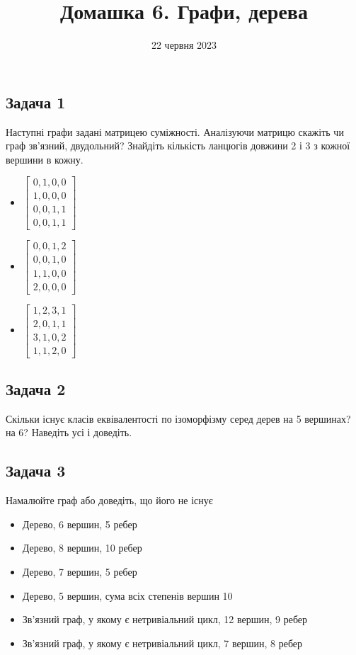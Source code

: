 \documentclass{article}
\begin{document}
\title{Домашка 6. Графи, дерева}
\date{22 червня 2023}

\maketitle

\subsection*{Задача 1}
Наступні графи задані матрицею суміжності. Аналізуючи матрицю скажіть чи граф зв'язний, двудольний? Знайдіть кількість
ланцюгів довжини 2 і 3 з кожної вершини в кожну.
\begin{itemize}
    \item
        $\begin{bmatrix}
            0,1,0,0 \\
            1,0,0,0 \\
            0,0,1,1 \\
            0,0,1,1
        \end{bmatrix}$
    \item
        $\begin{bmatrix}
            0,0,1,2 \\
            0,0,1,0 \\
            1,1,0,0 \\
            2,0,0,0
        \end{bmatrix}$
    \item
        $\begin{bmatrix}
            1,2,3,1 \\
            2,0,1,1 \\
            3,1,0,2 \\
            1,1,2,0
        \end{bmatrix}$
\end{itemize}

\subsection*{Задача 2}
Скільки існує класів еквівалентості по ізоморфізму серед дерев на 5 вершинах? на 6? Наведіть усі і доведіть.

\subsection*{Задача 3}
Намалюйте граф або доведіть, що його не існує
\begin{itemize}
    \item Дерево, 6 вершин, 5 ребер
    \item Дерево, 8 вершин, 10 ребер
    \item Дерево, 7 вершин, 5 ребер
    \item Дерево, 5 вершин, сума всіх степенів вершин 10
    \item Зв'язний граф, у якому є нетривіальний цикл, 12 вершин, 9 ребер
    \item Зв'язний граф, у якому є нетривіальний цикл, 7 вершин, 8 ребер
\end{itemize}
\end{document}
